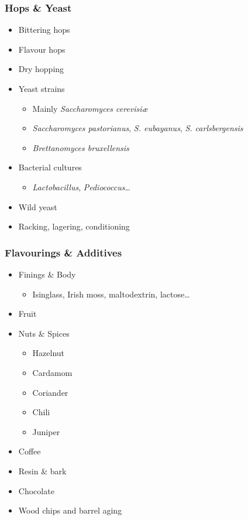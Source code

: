 \documentclass{beamer}
\begin{document}
\begin{frame}
  \frametitle{Hops \& Yeast}
  \begin{itemize}
  \item Bittering hops
  \item Flavour hops
  \item Dry hopping
    \bigskip
  \item Yeast strains
    \begin{itemize}
    \item Mainly \emph{Saccharomyces cerevisi\ae{}}
    \item \emph{Saccharomyces pastorianus}, \emph{S. eubayanus}, \emph{S. carlsbergensis}
    \item \emph{Brettanomyces bruxellensis}
    \end{itemize}
  \item Bacterial cultures
    \begin{itemize}
    \item \emph{Lactobacillus}, \emph{Pediococcus}\ldots
    \end{itemize}
  \item Wild yeast
    \bigskip
  \item Racking, lagering, conditioning
\end{itemize}
\end{frame}

\begin{frame}
  \frametitle{Flavourings \& Additives}
  \begin{itemize}
  \item Finings \& Body
    \begin{itemize}
    \item Isinglass, Irish moss, maltodextrin, lactose\ldots
    \end{itemize}
  \item Fruit
  \item Nuts \& Spices
    \begin{itemize}
    \item Hazelnut
    \item Cardamom
    \item Coriander
    \item Chili
    \item Juniper
    \end{itemize}
  \item Coffee
  \item Resin \& bark
  \item Chocolate
  \item Wood chips and barrel aging
\end{itemize}

\end{frame}
\end{document}
